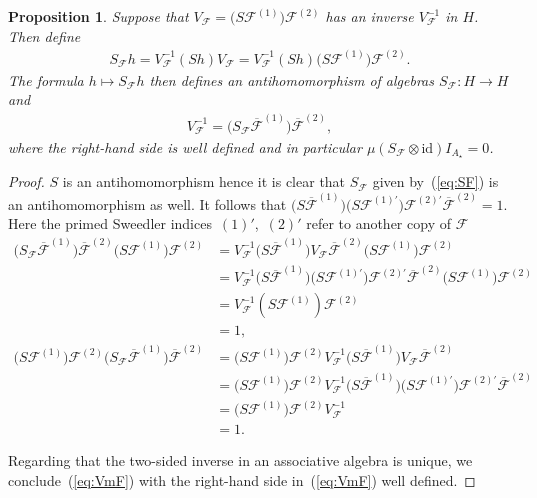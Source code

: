 \documentclass[pdftex]{sigma}
\def\id{\mathrm{id}}
\newtheorem{Proposition}[Theorem]{Proposition}
 { \theoremstyle{definition}
\newtheorem{Definition}[Theorem]{Definition}
\newtheorem{Example}[Theorem]{Example}
\newtheorem{Remark}[Theorem]{Remark} }
\numberwithin{equation}{section}
\begin{document}
\begin{Proposition}\label{prop:VFSF}
Suppose that $V_{\mathcal{F}} = \big(S\mathcal{F}^{(1)}\big)\mathcal{F}^{(2)}$ has an inverse $V^{-1}_{\mathcal{F}}$ in $H$. Then define
\begin{gather}\label{eq:SF}
S_{\mathcal{F}} h = V^{-1}_{\mathcal{F}} (S h) V_{\mathcal{F}} = V^{-1}_{\mathcal{F}} (S h) \big(S\mathcal{F}^{(1)}\big)\mathcal{F}^{(2)}.
\end{gather}
The formula $h\mapsto S_{\mathcal{F}} h$ then defines an antihomomorphism of algebras $S_{\mathcal{F}}\colon H\to H$ and
\begin{gather}\label{eq:VmF}
V^{-1}_{\mathcal{F}}= \big(S_{\mathcal{F}}\overline{\mathcal{F}}^{(1)}\big)\overline{\mathcal{F}}^{(2)},
\end{gather}
where the right-hand side is well defined and in particular $\mu(S_{\mathcal{F}}\otimes\id) I_{A_\star} = 0$.
\end{Proposition}
\begin{proof}
$S$ is an antihomomorphism hence it is clear that $S_{\mathcal{F}}$ given by~(\ref{eq:SF}) is an antihomomorphism as well. It follows that $\big(S\overline{\mathcal{F}}^{(1)}\big)\big(S\mathcal{F}^{(1)'}\big)\mathcal{F}^{(2)'}\overline{\mathcal{F}}^{(2)} = 1$. Here the primed Sweedler indi\-ces~$(1)'$,~$(2)'$ refer to another copy of $\mathcal{F}$
\begin{align*}
\big(S_{\mathcal{F}}\overline{\mathcal{F}}^{(1)}\big)\overline{\mathcal{F}}^{(2)}\big(S\mathcal{F}^{(1)}\big)\mathcal{F}^{(2)} & =
V^{-1}_{\mathcal{F}}\big(S\overline{\mathcal{F}}^{(1)}\big)V_{\mathcal{F}}\overline{\mathcal{F}}^{(2)}\big(S\mathcal{F}^{(1)}\big)\mathcal{F}^{(2)}
\\ & = V^{-1}_{\mathcal{F}}\big(S\overline{\mathcal{F}}^{(1)}\big)\big(S\mathcal{F}^{(1)'}\big)\mathcal{F}^{(2)'}\overline{\mathcal{F}}^{(2)}
\big(S\mathcal{F}^{(1)}\big)\mathcal{F}^{(2)}
\\ & = V^{-1}_{\mathcal{F}}(S\mathcal{F}^{(1)})\mathcal{F}^{(2)}
\\ & = 1,
\\
\big(S\mathcal{F}^{(1)}\big)\mathcal{F}^{(2)}\big(S_{\mathcal{F}}\overline{\mathcal{F}}^{(1)}\big)\overline{\mathcal{F}}^{(2)} & = \big(S\mathcal{F}^{(1)}\big)\mathcal{F}^{(2)}V^{-1}_{\mathcal{F}}\big(S\overline{\mathcal{F}}^{(1)}\big)V_{\mathcal{F}}\overline{\mathcal{F}}^{(2)}
\\ & = \big(S\mathcal{F}^{(1)}\big)\mathcal{F}^{(2)}V^{-1}_{\mathcal{F}}\big(S\overline{\mathcal{F}}^{(1)}\big)
\big(S\mathcal{F}^{(1)'}\big)\mathcal{F}^{(2)'}\overline{\mathcal{F}}^{(2)}
\\ & = \big(S\mathcal{F}^{(1)}\big)\mathcal{F}^{(2)}V^{-1}_{\mathcal{F}}
\\ & = 1.
\end{align*}

Regarding that the two-sided inverse in an associative algebra is unique, we conclude~(\ref{eq:VmF}) with the right-hand side in~(\ref{eq:VmF}) well defined.
\end{proof}
\end{document}
